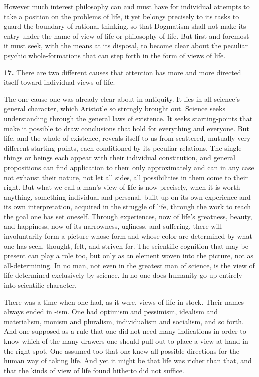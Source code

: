 \documentclass[12pt]{book}
\newcommand{\hnum}[1]{\textbf{#1.}\enspace}
\newcommand{\opage}[1]{\marginnote{\footnotesize\textit{[#1]}}}
\begin{document}
However much interest philosophy can and must have for individual attempts to take a position on the
problems of life, it yet belongs precisely to its tasks to guard the boundary of rational thinking, so
that Dogmatism shall not make its entry under the name of view of life or philosophy of life. But first
and foremost it must seek, with the means at its disposal, to become clear about the peculiar psychic
whole-formations that can step forth in the form of views of life.

\hnum{17} There are two different causes that attention has more and more directed itself toward
individual views of life.

The one cause one was already clear about in antiquity. It lies in all science's general character, which
Aristotle so strongly brought out. Science seeks understanding through the general laws of existence. It
seeks starting-points that make it possible to draw conclusions that hold for everything and everyone.
But life, and the whole of existence, reveals itself to us from scattered, mutually very different
starting-points, each conditioned by its peculiar relations. The single things or beings each appear
with their individual constitution, and general propositions can find application to them only
approximately and can in any case not exhaust their nature, not let all sides, all possibilities in them
come to their right. But what we call a man's view of life is now precisely, when it is worth anything,
something individual and \opage{53}personal, built up on its own experience and its own interpretation, acquired in
the struggle of life, through the work to reach the goal one has set oneself. Through experiences, now of
life's greatness, beauty, and happiness, now of its narrowness, ugliness, and suffering, there will
involuntarily form a picture whose form and whose color are determined by what one has seen, thought,
felt, and striven for. The scientific cognition that may be present can play a role too, but only as an
element woven into the picture, not as all-determining. In no man, not even in the greatest man of
science, is the view of life determined exclusively by science. In no one does humanity go up entirely
into scientific character.

There was a time when one had, as it were, views of life in stock. Their names always ended in -ism. One
had optimism and pessimism, idealism and materialism, monism and pluralism, individualism and socialism,
and so forth. And one supposed as a rule that one did not need many indications in order to know which of
the many drawers one should pull out to place a view at hand in the right spot. One assumed too that one
knew all possible directions for the human way of taking life. And yet it might be that life was richer
than that, and that the kinds of view of life found hitherto did not suffice.
\end{document}
